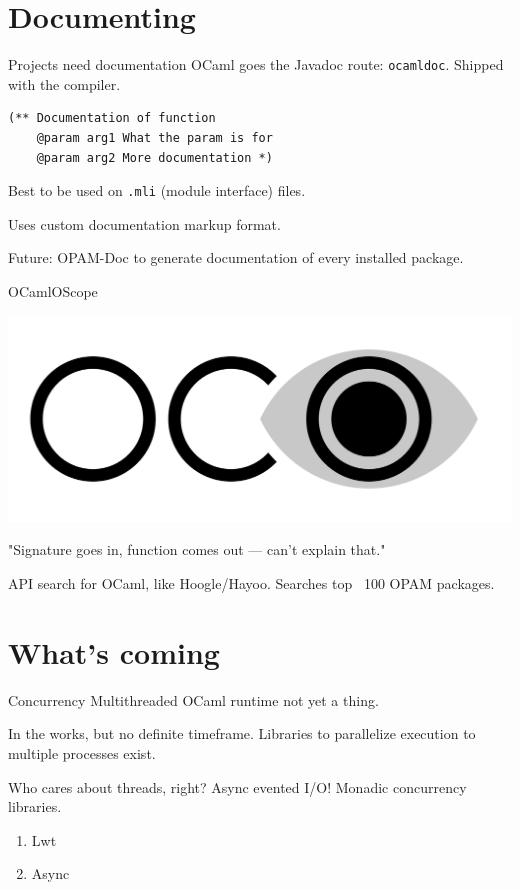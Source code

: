 \documentclass{beamer}
\begin{document}
\section{Documenting}

\begin{frame}[fragile]{Projects need documentation}
  OCaml goes the Javadoc route: \texttt{ocamldoc}. Shipped with the compiler.
  \begin{verbatim}
(** Documentation of function
    @param arg1 What the param is for
    @param arg2 More documentation *)
  \end{verbatim}
  Best to be used on \texttt{.mli} (module interface) files.

  Uses custom documentation markup format.

  Future: OPAM-Doc to generate documentation of every installed package.
\end{frame}

\begin{frame}{OCamlOScope}
  \begin{centering}
    \includegraphics[width=\textwidth]{ocamloscope}
  \end{centering}
  "Signature goes in, function comes out — can't explain that."

  API search for OCaml, like Hoogle/Hayoo. Searches top ~100 OPAM packages.
\end{frame}

\section{What's coming}

\begin{frame}{Concurrency}
  Multithreaded OCaml runtime not yet a thing.

  In the works, but no definite timeframe. Libraries to parallelize execution
  to multiple processes exist.

  Who cares about threads, right? Async evented I/O! Monadic concurrency
  libraries.
  \begin{enumerate}
    \item Lwt
    \item Async
  \end{enumerate}
\end{frame}
\end{document}
